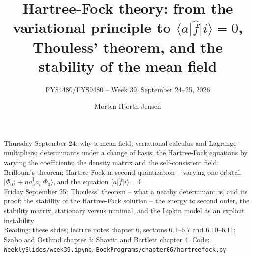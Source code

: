 \documentclass[aspectratio=169,10pt]{beamer}
\title{Hartree-Fock theory: from the variational principle to $\langle a\vert\hat{f}\vert i\rangle=0$, Thouless' theorem, and the stability of the mean field}
\subtitle{FYS4480/FYS9480 -- Week 39, September 24--25, 2026}
\author{Morten Hjorth-Jensen}
\institute{Department of Physics and Center for Computing in Science Education,\\
University of Oslo, Norway}
\date{}
\newcommand{\ket}[1]{\vert #1\rangle}
\begin{document}
\begin{frame}[plain]
  \vfill
  \begin{center}\scriptsize
  Thursday September 24: why a mean field; variational calculus and Lagrange multipliers; determinants under a change of basis; the Hartree-Fock equations by varying the coefficients; the density matrix and the self-consistent field; Brillouin's theorem; Hartree-Fock in second quantization -- varying one orbital, $\ket{\Phi_0}+\eta\,a_a^{\dagger}a_i\ket{\Phi_0}$, and the equation $\langle a\vert\hat{f}\vert i\rangle=0$\\
  Friday September 25: Thouless' theorem -- what a nearby determinant is, and its proof; the stability of the Hartree-Fock solution -- the energy to second order, the stability matrix, stationary versus minimal, and the Lipkin model as an explicit instability\\[0.2em]
  Reading: these slides; lecture notes chapter 6, sections 6.1--6.7 and 6.10--6.11; Szabo and Ostlund chapter 3; Shavitt and Bartlett chapter 4. Code: \texttt{WeeklySlides/week39.ipynb}, \texttt{BookPrograms/chapter06/hartreefock.py}
  \end{center}
\end{frame}
\end{document}
